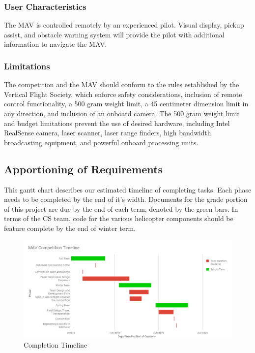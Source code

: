 \documentclass[onecolumn, draftclsnofoot, 10pt, compsoc]{IEEEtran}
\begin{document}
\subsubsection{User Characteristics}
The MAV is controlled remotely by an experienced pilot. Visual display, pickup assist, and obstacle warning system will provide the pilot with additional information to navigate the MAV.
\subsubsection{Limitations}
The competition and the MAV should conform to the rules established by the Vertical Flight Society, which enforce safety considerations, inclusion of remote control functionality, a 500 gram weight limit, a 45 centimeter dimension limit in any direction, and inclusion of an onboard camera. The 500 gram weight limit and budget limitations prevent the use of desired hardware, including Intel RealSense camera, laser scanner, laser range finders, high bandwidth broadcasting equipment, and powerful onboard processing units.
\subsection{Apportioning of Requirements}
This gantt chart describes our estimated timeline of completing tasks. Each phase needs to be completed by the end of it’s width. Documents for the grade portion of this project are due by the end of each term, denoted by the green bars. In terms of the CS team, code for the various helicopter components should be feature complete by the end of winter term.
\begin{figure}[h!]
\centering
\includegraphics[width=1.0\textwidth]{completion_timeline}
\caption{Completion Timeline}
\end{figure}
\end{document}
